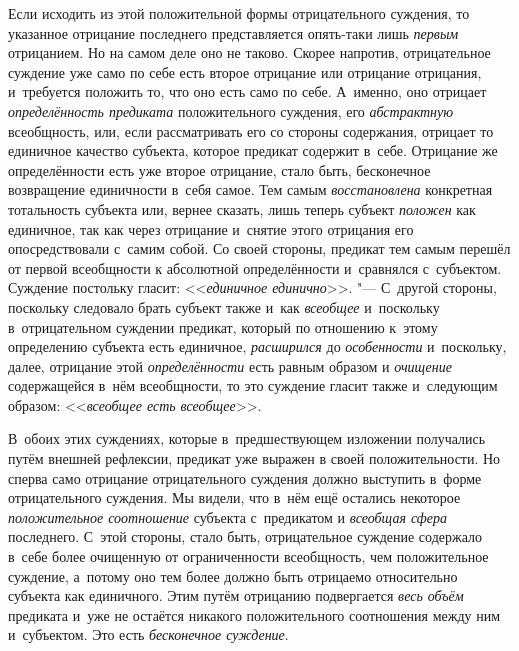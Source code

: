 Если исходить из этой положительной формы отрицательного суждения, то указанное
отрицание последнего представляется опять-таки лишь {\em первым} отрицанием.
Но на самом деле оно не таково. Скорее напротив, отрицательное суждение уже
само по себе есть второе отрицание или отрицание отрицания, и~требуется
положить то, что оно есть само по себе. А~именно, оно отрицает
{\em определённость предиката} положительного суждения, его {\em абстрактную}
всеобщность, или, если рассматривать его со стороны содержания, отрицает то
единичное качество субъекта, которое предикат содержит в~себе. Отрицание же
определённости есть уже второе отрицание, стало быть, бесконечное возвращение
единичности в~себя самое. Тем самым {\em восстановлена} конкретная тотальность
субъекта или, вернее сказать, лишь теперь субъект {\em положен} как единичное,
так как через отрицание и~снятие этого отрицания его опосредствовали с~самим
собой. Со своей стороны, предикат тем самым перешёл от первой всеобщности к
абсолютной определённости и~сравнялся с~субъектом. Суждение постольку гласит:
<<{\em единичное единично}>>. "--- С~другой стороны, поскольку следовало брать
субъект также и~как {\em всеобщее} и~поскольку в~отрицательном суждении
предикат, который по отношению к~этому определению субъекта есть единичное,
{\em расширился} до {\em особенности} и~поскольку, далее, отрицание этой
{\em определённости} есть равным образом и {\em очищение} содержащейся в~нём
всеобщности, то это суждение гласит также и~следующим образом:
<<{\em всеобщее есть всеобщее}>>.

В~обоих этих суждениях, которые в~предшествующем
изложении
получались путём внешней рефлексии, предикат уже выражен в
своей положительности. Но сперва само отрицание отрицательного суждения
должно выступить в~форме отрицательного суждения. Мы видели, что в~нём ещё
остались некоторое {\em положительное соотношение} субъекта с~предикатом и
{\em всеобщая сфера} последнего. С~этой стороны, стало быть,
отрицательное суждение содержало в~себе более очищенную от ограниченности
всеобщность, чем положительное суждение, а~потому оно тем более должно быть
отрицаемо относительно субъекта как единичного. Этим путём отрицанию
подвергается {\em весь объём} предиката и~уже не остаётся никакого
положительного соотношения между ним и~субъектом. Это есть
{\em бесконечное суждение}.



